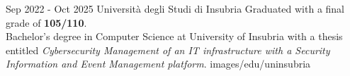 {Sep 2022 - Oct 2025}
{Università degli Studi di Insubria}
{Graduated with a final grade of \textbf{105/110}.\\
Bachelor's degree in Computer Science at University of Insubria
with a thesis entitled \textit{Cybersecurity Management of an IT
infrastructure with a Security Information and Event Management
platform}.}
{images/edu/uninsubria}

